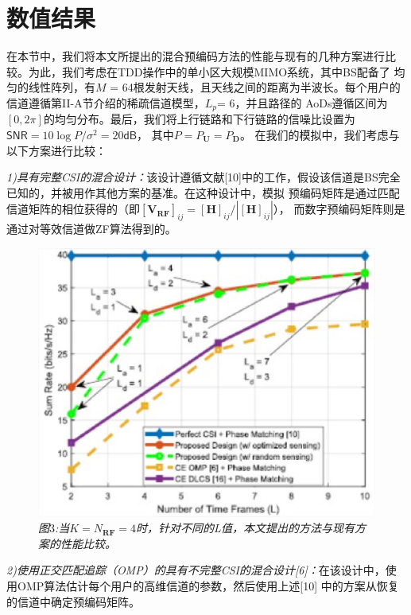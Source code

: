 \documentclass[10pt,journal,final]{IEEEtran}%
\begin{document}
\section{数值结果} 
\vspace{0.2em}
在本节中，我们将本文所提出的混合预编码方法的性能与现有的几种方案进行比较。为此，我们考虑在TDD操作中的单小区大规模MIMO系统，其中BS配备了
均匀的线性阵列，有$M$ = 64根发射天线，且天线之间的距离为半波长。每个用户的信道遵循第II-A节介绍的稀疏信道模型，$L_{p}$= 6，并且路径的
AoDs遵循区间为$[0,2\pi]$的均匀分布。最后，我们将上行链路和下行链路的信噪比设置为$\mathsf{SNR}=10\log P/\sigma^{2}=20\mathsf{dB}$，
其中$P=P_{\mathbf{U}}=P_{\mathbf{D}}$。 在我们的模拟中，我们考虑与以下方案进行比较：

\textit{1)具有完整CSI的混合设计：}该设计遵循文献[10]中的工作，假设该信道是BS完全已知的，并被用作其他方案的基准。在这种设计中，模拟
预编码矩阵是通过匹配信道矩阵的相位获得的（即$[\mathbf{V}_{\mathbf{RF}}]_{ij}=[\mathbf{H}]_{ij}/|[\mathbf{H}]_{ij} | $），
而数字预编码矩阵则是通过对等效信道做ZF算法得到的。
\begin{figure}[H]
    \centering
    \includegraphics[scale=0.55]{3.eps}
    \caption*{\textit{\small{图}}\small{3}\textit{\small{:当$K=N_{\mathbf{RF}}=4$时，针对不同的L值，本文提出的方法与现有方案的性能比较。}}}
\end{figure}
\vspace{-0.9em}
\textit{2)使用正交匹配追踪（OMP）的具有不完整CSI的混合设计[6]：}在该设计中，使用OMP算法估计每个用户的高维信道的参数，然后使用上述[10]
中的方案从恢复的信道中确定预编码矩阵。
\end{document}
